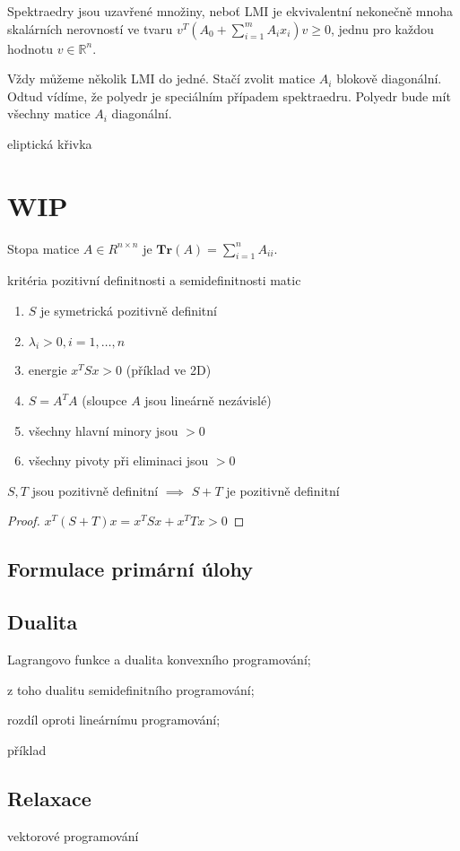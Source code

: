 Spektraedry jsou uzavřené množiny, neboť LMI je ekvivalentní nekonečně mnoha skalárních nerovností ve tvaru $v^T(A_0 + \sum_{i=1}^m A_ix_i)v \geq 0$, jednu pro každou hodnotu $v \in \mathbb{R}^n$.

Vždy můžeme několik LMI  do jedné. Stačí zvolit matice $A_i$ blokově diagonální. Odtud vídíme, že polyedr je speciálním případem spektraedru. Polyedr bude mít všechny matice $A_i$ diagonální.

\begin{pr}
    eliptická křivka
\end{pr}


\section*{WIP}

Stopa matice $A \in R^{n \times n}$ je $\textbf{Tr}(A) = \sum_{i=1}^n A_{ii}$.

kritéria pozitivní definitnosti a semidefinitnosti matic

\begin{enumerate}
    \item $S$ je symetrická pozitivně definitní
    \item $\lambda_i > 0, i=1, \dots, n$
    \item energie $x^TSx > 0$ (příklad ve 2D)
    \item $S = A^TA$ (sloupce $A$ jsou lineárně nezávislé)
    \item všechny hlavní minory jsou $> 0$
    \item všechny pivoty při eliminaci jsou $> 0$
\end{enumerate}


\begin{vt}
$S, T$ jsou pozitivně definitní $\implies$ $S + T$ je pozitivně definitní
\end{vt}

\begin{proof}
$x^T (S+T) x = x^T S x + x^T T x > 0$
\end{proof}

\subsection*{Formulace primární úlohy}


\subsection*{Dualita}
\noindent Lagrangovo funkce a dualita konvexního programování;

\noindent z toho dualitu semidefinitního programování;

\noindent rozdíl oproti lineárnímu programování;

\noindent příklad

\subsection*{Relaxace}
\noindent vektorové programování

